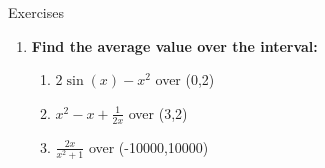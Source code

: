 \documentclass[../revisedmain.tex]{subfiles}
\begin{document}
	\newpage
	\begin{center}
		\LARGE Exercises
	\end{center}
	\begin{enumerate}
		\item \textbf{Find the average value over the interval:}
		\begin{enumerate}
			\item $2\sin(x)-x^2$ over (0,2)
			\item $x^2-x+\frac{1}{2x}$ over (3,2)
			\item $\frac{2x}{x^2+1}$ over (-10000,10000)
		\end{enumerate}
	\end{enumerate}
\end{document}
